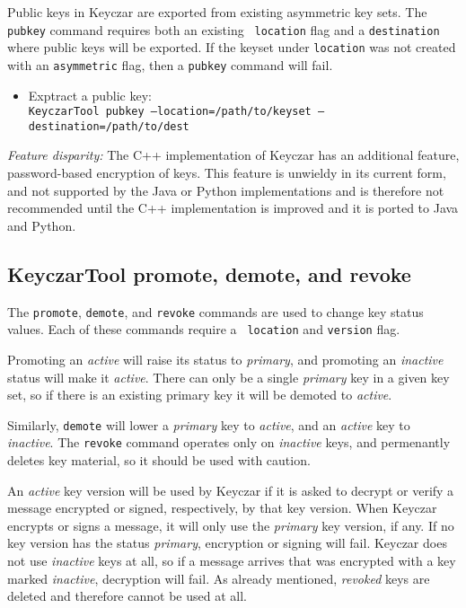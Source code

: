 \documentclass{llncs}
\begin{document}
Public keys in Keyczar are exported from existing asymmetric key
sets. The {\tt pubkey} command requires both an existing {\tt
  location} flag and a {\tt destination} where public keys will be
exported. If the keyset under {\tt location} was not created with an
{\tt asymmetric} flag, then a {\tt pubkey} command will fail.

\begin{itemize}
\item Exptract a public key: \\
{\tt KeyczarTool pubkey --location=/path/to/keyset
  --destination=/path/to/dest}
\end{itemize}

\emph{Feature disparity:} The C++ implementation of Keyczar has an
additional feature, password-based encryption of keys.  This feature
is unwieldy in its current form, and not supported by the Java or
Python implementations and is therefore not recommended until the C++
implementation is improved and it is ported to Java and Python.

\subsection{KeyczarTool promote, demote, and revoke}

The {\tt promote}, {\tt demote}, and {\tt revoke} commands are used to
change key status values. Each of these commands require a {\tt
  location} and {\tt version} flag.

Promoting an {\it active} will raise its status to {\it primary}, and
promoting an {\it inactive} status will make it {\it active}. There
can only be a single {\it primary} key in a given key set, so if there
is an existing primary key it will be demoted to {\it active}.

Similarly, {\tt demote} will lower a {\it primary} key to {\it
  active}, and an {\it active} key to {\it inactive}. The {\tt revoke}
command operates only on {\it inactive} keys, and permenantly deletes
key material, so it should be used with caution.

An {\it active} key version will be used by Keyczar if it is asked to
decrypt or verify a message encrypted or signed, respectively, by that
key version.  When Keyczar encrypts or signs a message, it will only
use the {\it primary} key version, if any.  If no key version has the
status {\it primary}, encryption or signing will fail.  Keyczar does
not use {\it inactive} keys at all, so if a message arrives that was
encrypted with a key marked {\it inactive}, decryption will fail.  As
already mentioned, {\it revoked} keys are deleted and therefore cannot
be used at all.
\end{document}
